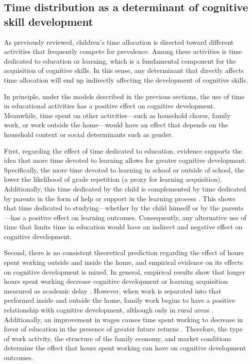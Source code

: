 \documentclass[12pt]{article}
\begin{document}
\subsection{Time distribution as a determinant of cognitive skill development}
\label{subsec:timedeterminant}

As previously reviewed, children's time allocation is directed toward different
activities that frequently compete for prevalence. Among these activities is
time dedicated to education or learning, which is a fundamental component for
the acquisition of cognitive skills. In this sense, any determinant that
directly affects time allocation will end up indirectly affecting the
development of cognitive skills.

In principle, under the models described in the previous sections, the use of
time in educational activities has a positive effect on cognitive development.
Meanwhile, time spent on other activities—such as household chores, family
work, or work outside the home—would have an effect that depends on the
household context or social determinants such as gender.

First, regarding the effect of time dedicated to education, evidence supports
the idea that more time devoted to learning allows for greater cognitive
development. Specifically, the more time devoted to learning in school or
outside of school, the lower the likelihood of grade repetition (a proxy for
learning acquisition). Additionally, this time dedicated by the child is
complemented by time dedicated by parents in the form of help or support in
the learning process \citep{beltran2013}. This shows that time dedicated to
studying—whether by the child himself or by the parents—has a positive effect
on learning outcomes. Consequently, any alternative use of time that limits
time in education would have an indirect and negative effect on cognitive
development.

Second, there is no consistent theoretical prediction regarding the effect of
hours spent working outside and inside the home, and empirical evidence on its
effects on cognitive development is mixed. In general, empirical results show
that longer hours spent working decrease cognitive development or learning
acquisition measured as academic delay \citep{beltran2013}. However, when
work is separated into that performed inside and outside the home, family work
begins to have a positive relationship with cognitive development, although
only in rural areas \citep{ponce2012}. Additionally, an improvement in wages
causes time spent working to decrease in favor of education in the presence
of greater future returns \citep{beltran2013}. Therefore, the type of work
activity, the structure of the family economy, and market conditions determine
the effect that hours spent working can have on cognitive development outcomes.
\end{document}
